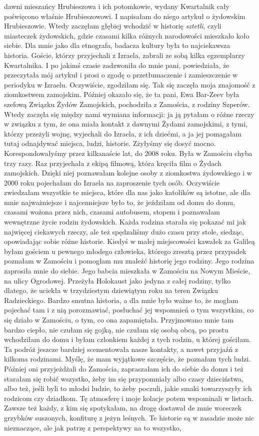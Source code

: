 dawni mieszańcy Hrubieszowa i ich potomkowie, wydany Kwartalnik cały poświęcono właśnie Hrubieszowowi. I napisałam do niego artykuł o żydowskim Hrubieszowie. Wtedy zaczęłam głębiej wchodzić w historię \textit{sztetli}, czyli miasteczek żydowskich, gdzie czasami kilka różnych narodowości mieszkało koło siebie. Dla mnie jako dla etnografa, badacza kultury była to najciekawsza historia. Goście, którzy przyjechali z Izraela, zabrali ze sobą kilka egzemplarzy Kwartalnika. I po jakimś czasie zadzwoniła do mnie pani, powiedziała, że przeczytała mój artykuł i prosi o zgodę o przetłumaczenie i zamieszczenie w periodyku w Izraelu. Oczywiście, zgodziłam się. Tak się zaczęła moja znajomość z ziomkostwem zamojskim. Później okazało się, że ta pani, Ewa Bar-Zeev była szefową Związku Żydów Zamojskich, pochodziła z Zamościa, z rodziny Szperów. Wtedy zaczęła się między nami  wymiana informacji: ja ją pytałam o różne rzeczy w związku z tym, że ona miała kontakt z dawnymi Żydami zamojskimi, z tymi, którzy przeżyli wojnę, wyjechali do Izraela, z ich dziećmi, a ja jej pomagałam tutaj odnajdywać miejsca, ludzi, historie. Zżyłyśmy się dosyć mocno. Korespondowałyśmy przez kilkanaście lat, do 2008 roku. Była w Zamościu chyba trzy razy. Raz przyjechała z ekipą filmową, która kręciła film o Żydach zamojskich. Dzięki niej poznawałam kolejne osoby z ziomkostwa żydowskiego i w 2000 roku pojechałam do Izraela na zaproszenie tych osób. Oczywiście zwiedzałam wszystkie te miejsca, które dla nas jako katolików są istotne, ale dla mnie najważniejsze i najcenniejsze było to, że jeździłam od domu do domu, czasami wożona przez nich, czasami autobusem, stopem i poznawałam wewnętrzne życie rodzin żydowskich. Każda rodzina starała się pokazać mi jak najwięcej ciekawych rzeczy, ale też spędzaliśmy dużo czasu przy stole, siedząc, opowiadając sobie różne historie. Kiedyś w małej miejscowości kawałek za Galileą byłam gościem u pewnego młodego człowieka, którego zresztą przez przypadek poznałam w Zamościu i pomogłam mu znaleźć historię jego rodziny. Jego rodzina zaprosiła mnie do siebie. Jego babcia mieszkała w Zamościu na Nowym Mieście, na ulicy Ogrodowej. Przeżyła Holokaust jako jedyna z całej rodziny, tylko dlatego, że uciekła w trzydziestym dziewiątym roku na teren Związku Radzieckiego. Bardzo smutna historia, a dla mnie było ważne to, że mogłam pojechać tam i z nią porozmawiać, posłuchać jej wspomnień o tym wszystkim, co się działo w Zamościu, o tym, co ona zapamiętała. Przyjmowano mnie tam bardzo ciepło, nie czułam się gojką, nie czułam się osobą obcą, po prostu wchodziłam do domu i byłam członkiem każdej z tych rodzin, u której gościłam. Ta podróż jeszcze bardziej scementowała nasze kontakty, a nawet przyjaźń z kilkoma rodzinami. Myślę, że mam wyjątkowe szczęście, że poznałam tych ludzi.  Później oni przyjeżdżali do Zamościa, zapraszałam ich do siebie do domu i też starałam się robić wszystko, żeby im się przypomniały albo czasy dzieciństwa, albo też, jeśli byli to młodsi ludzie, to żeby poczuli, jakie smaki towarzyszyły ich rodzicom czy dziadkom. Tę atmosferę i moje kolacje potem wspominali w listach. Zawsze też każdy, z kim się spotykałam, na drogę dostawał de mnie woreczek grzybków suszonych, konfiturę z jeżyn leśnych. Te historie są w zasadzie może nic nieznaczące, ale jak patrzę z perspektywy na to wszystko, 